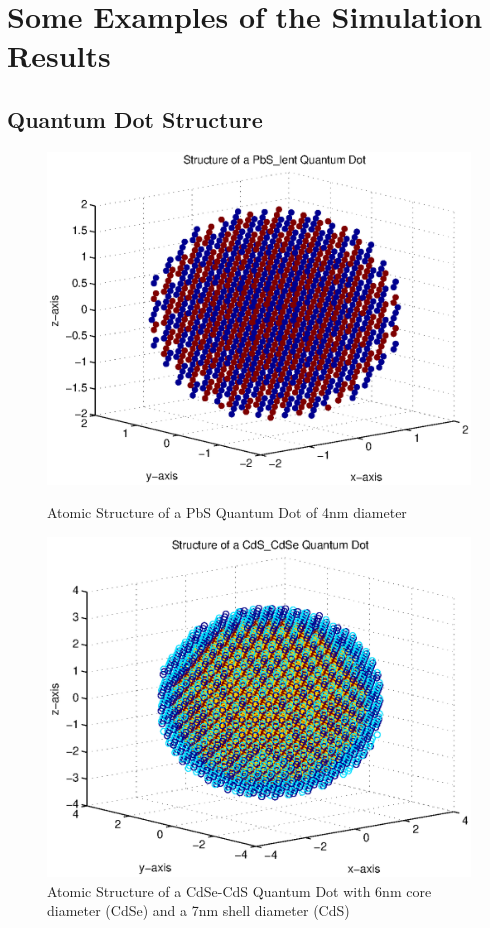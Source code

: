 \documentclass[a4paper, 11pt, landscape]{article}
\begin{document}
	\newpage
	
	\section{Some Examples of the Simulation Results}
		\subsection{Quantum Dot Structure}
			\begin{figure}[htbp]
				\begin{minipage}[t]{0.48\textwidth}
						\includegraphics[width=\textwidth]{figures/StructurePlotPbS.eps}
						\caption{Atomic Structure of a PbS Quantum Dot of 4nm diameter}
				\end{minipage}
				\hfill
				\begin{minipage}[t]{0.48\textwidth}
						\includegraphics[width=\textwidth]{figures/StructurePlotCdS_CdSe.eps}
						\caption{Atomic Structure of a CdSe-CdS Quantum Dot with 6nm core
										 diameter (CdSe) and a 7nm shell diameter (CdS)}
				\end{minipage}
			\end{figure}
		
\end{document}
